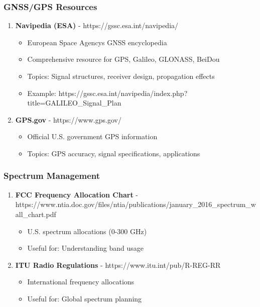 \subsubsection{GNSS/GPS Resources}\label{gnssgps-resources}

\begin{enumerate}
\def\labelenumi{\arabic{enumi}.}
\setcounter{enumi}{44}
\tightlist
\item
  \textbf{Navipedia (ESA)} - https://gssc.esa.int/navipedia/

  \begin{itemize}
  \tightlist
  \item
    European Space Agency\textquotesingle s GNSS encyclopedia
  \item
    Comprehensive resource for GPS, Galileo, GLONASS, BeiDou
  \item
    Topics: Signal structures, receiver design, propagation effects
  \item
    Example:
    https://gssc.esa.int/navipedia/index.php?title=GALILEO\_Signal\_Plan
  \end{itemize}
\item
  \textbf{GPS.gov} - https://www.gps.gov/

  \begin{itemize}
  \tightlist
  \item
    Official U.S. government GPS information
  \item
    Topics: GPS accuracy, signal specifications, applications
  \end{itemize}
\end{enumerate}

\subsubsection{Spectrum Management}\label{spectrum-management}

\begin{enumerate}
\def\labelenumi{\arabic{enumi}.}
\setcounter{enumi}{46}
\tightlist
\item
  \textbf{FCC Frequency Allocation Chart} -
  https://www.ntia.doc.gov/files/ntia/publications/january\_2016\_spectrum\_wall\_chart.pdf

  \begin{itemize}
  \tightlist
  \item
    U.S. spectrum allocations (0-300 GHz)
  \item
    Useful for: Understanding band usage
  \end{itemize}
\item
  \textbf{ITU Radio Regulations} - https://www.itu.int/pub/R-REG-RR

  \begin{itemize}
  \tightlist
  \item
    International frequency allocations
  \item
    Useful for: Global spectrum planning
  \end{itemize}
\end{enumerate}

